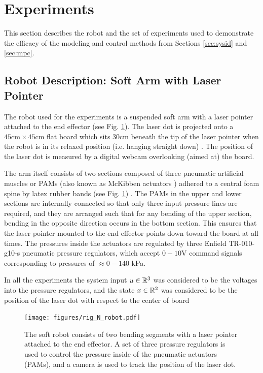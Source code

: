 \section{Experiments}
\label{sec:experiments}

This section describes the robot and the set of experiments used to demonstrate the efficacy of the modeling and control methods from Sections \ref{sec:sysid} and \ref{sec:mpc}.

\subsection{Robot Description: Soft Arm with Laser Pointer}
\label{sec:robot}

The robot used for the experiments is a suspended soft arm with a laser pointer attached to the end effector (see Fig. \ref{fig:rig}). 
The laser dot is projected onto a ${45\text{cm} \times 45\text{cm}}$ flat board which sits $30\text{cm}$ beneath the tip of the laser pointer when the robot is in its relaxed position (i.e. hanging straight down) .
The position of the laser dot is measured by a digital webcam overlooking (aimed at) the board.

The arm itself consists of two sections composed of three pneumatic artificial muscles or PAMs (also known as McKibben actuators \cite{tondu2012modelling}) adhered to a central foam spine by latex rubber bands (see Fig. \ref{fig:rig}) .
The PAMs in the upper and lower sections are internally connected so that only three input pressure lines are required, and
they are arranged such that for any bending of the upper section, bending in the opposite direction occurs in the bottom section.
This ensures that the laser pointer mounted to the end effector points down toward the board at all times.
The pressures inside the actuators are regulated by three Enfield TR-010-g10-s pneumatic pressure regulators, which accept ${0-10}$V command signals corresponding to pressures of ${ \approx 0 - 140 }$ kPa.

In all the experiments the system input ${u \in \mathbb{R}^{3}}$ was considered to be the voltages into the pressure regulators,
and the state ${x \in \mathbb{R}^2}$ was considered to be the position of the laser dot with respect to the center of board


\begin{figure}
    \centering
    \texttt{[image: figures/rig\_N\_robot.pdf]}
    \caption{The soft robot consists of two bending segments with a laser pointer attached to the end effector. A set of three pressure regulators is used to control the pressure inside of the pneumatic actuators (PAMs), and a camera is used to track the position of the laser dot.}
    \label{fig:rig}
\end{figure}

